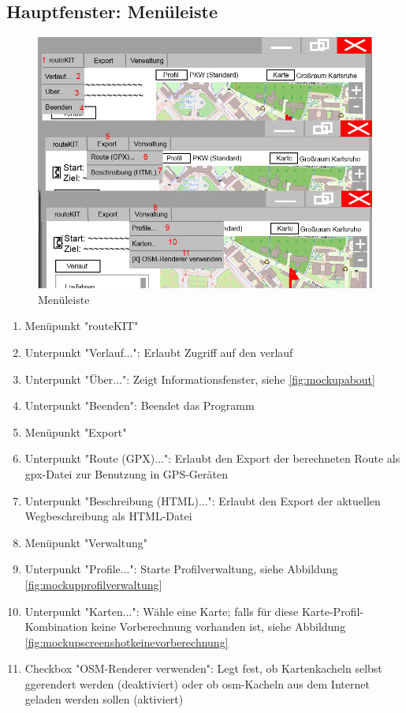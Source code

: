 \documentclass[a4paper, 11pt]{article}
\begin{document}
\subsection{Hauptfenster: Menüleiste}
\begin{figure}[H]
\centering
\includegraphics[width=0.7\linewidth]{mockup_screenshot_menu}
\caption{Menüleiste}
\label{fig:mockupscreenshotmenu}
\end{figure}
\begin{enumerate}
\item Menüpunkt "routeKIT"
\item Unterpunkt "Verlauf...": Erlaubt Zugriff auf den \gls{verlauf}
\item Unterpunkt "Über...": Zeigt Informationsfenster, siehe \ref{fig:mockupabout} %
\item Unterpunkt "Beenden": Beendet das Programm
\item Menüpunkt "Export"
\item Unterpunkt "Route (GPX)...": Erlaubt den Export der berechneten Route als \gls{gpx}-Datei zur Benutzung in GPS-Geräten
\item Unterpunkt "Beschreibung (HTML)...": Erlaubt den Export der aktuellen Wegbeschreibung als HTML-Datei
\item Menüpunkt "Verwaltung"
\item Unterpunkt "Profile...": Starte Profilverwaltung, siehe Abbildung \ref{fig:mockupprofilverwaltung}
\item Unterpunkt "Karten...": Wähle eine Karte; falls für diese Karte-Profil-Kombination keine Vorberechnung vorhanden ist, siehe Abbildung \ref{fig:mockupscreenshotkeinevorberechnung}
\item Checkbox "OSM-Renderer verwenden": Legt fest, ob Kartenkacheln selbst ggerendert werden (deaktiviert) oder ob \gls{osm}-Kacheln aus dem Internet geladen werden sollen (aktiviert)
\end{enumerate}
\end{document}

